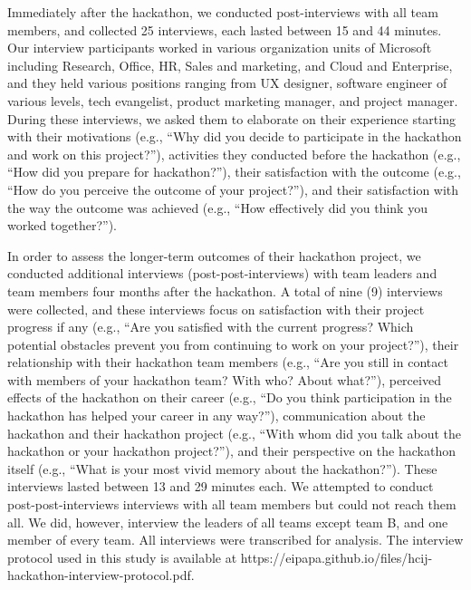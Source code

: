 \documentclass{hcij}
\begin{document}
Immediately after the hackathon, we conducted post-interviews with all team members, and collected 25 interviews, each lasted between 15 and 44 minutes. Our interview participants worked in various organization units of Microsoft including Research, Office, HR, Sales and marketing, and Cloud and Enterprise, and they held various positions ranging from UX designer, software engineer of various levels, tech evangelist, product marketing manager, and project manager. During these interviews, we asked them to elaborate on their experience starting with their motivations (e.g., “Why did you decide to participate in the hackathon and work on this project?”), activities they conducted before the hackathon (e.g., “How did you prepare for hackathon?”), their satisfaction with the outcome (e.g., “How do you perceive the outcome of your project?”), and their satisfaction with the way the outcome was achieved (e.g., “How effectively did you think you worked together?”).

In order to assess the longer-term outcomes of their hackathon project, we conducted additional interviews (post-post-interviews) with team leaders and team members four months after the hackathon. A total of nine (9) interviews were collected, and these interviews focus on satisfaction with their project progress if any (e.g., “Are you satisfied with the current progress? Which potential obstacles prevent you from continuing to work on your project?”), their relationship with their hackathon team members (e.g., “Are you still in contact with members of your hackathon team? With who? About what?”), perceived effects of the hackathon on their career (e.g., “Do you think participation in the hackathon has helped your career in any way?”), communication about the hackathon and their hackathon project (e.g., “With whom did you talk about the hackathon or your hackathon project?”), and their perspective on the hackathon itself (e.g., “What is your most vivid memory about the hackathon?”). These interviews lasted between 13 and 29 minutes each. We attempted to conduct post-post-interviews interviews with all team members but could not reach them all. We did, however, interview the leaders of all teams except team B, and one member of every team. All interviews were transcribed for analysis. The interview protocol used in this study is available at https://eipapa.github.io/files/hcij-hackathon-interview-protocol.pdf.
\end{document}
